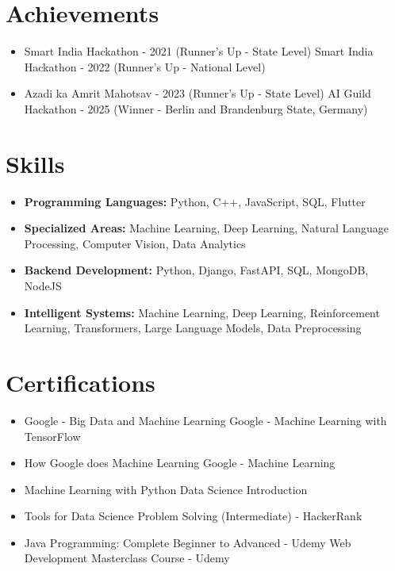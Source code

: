 \documentclass[a4paper,10pt]{article}
\begin{document}
\section*{Achievements}
\begin{itemize}
\item Smart India Hackathon - 2021 (Runner's Up - State Level) \hfill Smart India Hackathon - 2022 (Runner's Up - National Level)
\item Azadi ka Amrit Mahotsav - 2023 (Runner's Up - State Level) \hfill AI Guild Hackathon - 2025 (Winner - Berlin and Brandenburg State, Germany)
\end{itemize}

\section*{Skills}
\begin{itemize}
  \item \textbf{Programming Languages:} Python, C++, JavaScript, SQL, Flutter
  \item \textbf{Specialized Areas:} Machine Learning, Deep Learning, Natural Language Processing, Computer Vision, Data Analytics
  \item \textbf{Backend Development:} Python, Django, FastAPI, SQL, MongoDB, NodeJS
  \item \textbf{Intelligent Systems:} Machine Learning, Deep Learning, Reinforcement Learning, Transformers, Large Language Models, Data Preprocessing
\end{itemize}

\section*{Certifications}
\begin{itemize}
\item Google - Big Data and Machine Learning \hfill Google - Machine Learning with TensorFlow
\item How Google does Machine Learning \hfill Google - Machine Learning
\item Machine Learning with Python \hfill Data Science Introduction
\item Tools for Data Science \hfill Problem Solving (Intermediate) - HackerRank
\item Java Programming: Complete Beginner to Advanced - Udemy \hfill Web Development Masterclass Course - Udemy
\end{itemize}
\end{document}
